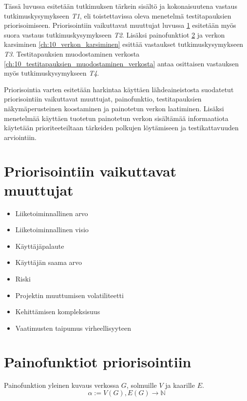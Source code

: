 Tässä luvussa esitetään tutkimuksen tärkein sisältö ja kokonaisuutena vastaus tutkimuskysymykseen \emph{T1}, eli toistettavissa oleva menetelmä testitapauksien priorisoimiseen.
Priorisointiin vaikuttavat muuttujat luvussa \ref{ch:10_priorisointiin_vaikuttavat_muuttujat} esitetään myös suora vastaus tutkimuskysymykseen \emph{T2}.
Lisäksi painofunktiot \ref{ch:10_painofunktiot_priorisointiin} ja verkon karsiminen \ref{ch:10_verkon_karsiminen} esittää vastaukset tutkimuskysymykseen \emph{T3}.
Testitapauksien muodostaminen verkosta \ref{ch:10_testitapauksien_muodostaminen_verkosta} antaa osittaisen vastauksen myös tutkimuskysymykseen \emph{T4}.

Priorisointia varten esitetään harkintaa käyttäen lähdeaineistosta suodatetut priorisointiin vaikuttavat muuttujat, painofunktio, testitapauksien näkymäperusteinen koostaminen ja painotetun verkon laatiminen.
Lisäksi menetelmää käyttäen tuotetun painotetun verkon sisältämää informaatiota käytetään prioriteeteiltaan tärkeiden polkujen löytämiseen ja testikattavuuden arviointiin.

\section{Priorisointiin vaikuttavat muuttujat} \label{ch:10_priorisointiin_vaikuttavat_muuttujat}

  \begin{itemize}
    \item Liiketoiminnallinen arvo
    \item Liiketoiminnallinen visio
    \item Käyttäjäpalaute
    \item Käyttäjän saama arvo
    \item Riski
    \item Projektin muuttumisen volatiliteetti
    \item Kehittämisen kompleksisuus
    \item Vaatimusten taipumus virheellisyyteen
  \end{itemize}

\section{Painofunktiot priorisointiin} \label{ch:10_painofunktiot_priorisointiin}

  Painofunktion yleinen kuvaus verkossa \(G\), solmuille \(V\) ja kaarille \(E\).
  \[\alpha := V(G), E(G) \rightarrow \mathbb{N}\]

